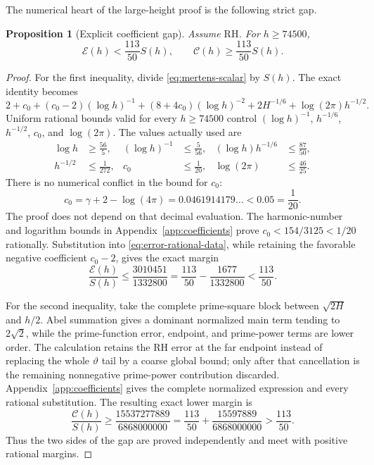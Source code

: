 \documentclass[11pt]{amsart}
\newtheorem{proposition}[theorem]{Proposition}
\theoremstyle{definition}
\theoremstyle{remark}
\numberwithin{equation}{section}
\newcommand{\RH}{\mathrm{RH}}
\newcommand{\euler}{\gamma}
\newcommand{\E}{\mathcal{E}}
\newcommand{\Pcost}{\mathcal{C}}
\begin{document}
The numerical heart of the large-height proof is the following strict gap.

\begin{proposition}[Explicit coefficient gap]\label{prop:coefficient-gap}
Assume $\RH$.  For $h\ge74500$,
\begin{equation}\label{eq:two-coefficients}
  \E(h)<\frac{113}{50}S(h),
  \qquad
  \Pcost(h)\ge\frac{113}{50}S(h).
\end{equation}
\end{proposition}

\begin{proof}
For the first inequality, divide \eqref{eq:mertens-scalar} by $S(h)$.
The exact identity becomes
\[
  2+c_0+(c_0-2)(\log h)^{-1}
  +(8+4c_0)(\log h)^{-2}
  +2H^{-1/6}+\log(2\pi)h^{-1/2}.
\]
Uniform rational bounds valid for every $h\ge74500$ control
$(\log h)^{-1}$, $h^{-1/6}$, $h^{-1/2}$, $c_0$, and $\log(2\pi)$.
The values actually used are
\begin{equation}\label{eq:error-rational-data}
\begin{aligned}
 \log h&\ge\frac{56}{5}, &
 (\log h)^{-1}&\le\frac5{56}, &
 (\log h)h^{-1/6}&\le\frac{87}{50},\\
 h^{-1/2}&\le\frac1{272}, &
 c_0&\le\frac1{20}, &
 \log(2\pi)&\le\frac{46}{25}.
\end{aligned}
\end{equation}
There is no numerical conflict in the bound for $c_0$:
\[
 c_0=\euler+2-\log(4\pi)
     =0.0461914179\ldots < 0.05=\frac1{20}.
\]
The proof does not depend on that decimal evaluation.  The harmonic-number
and logarithm bounds in Appendix~\ref{app:coefficients} prove
$c_0<154/3125<1/20$ rationally.  Substitution into
\eqref{eq:error-rational-data}, while retaining the favorable negative
coefficient $c_0-2$, gives the exact margin
\[
 \frac{\E(h)}{S(h)}\le\frac{3010451}{1332800}
 =\frac{113}{50}-\frac{1677}{1332800}<\frac{113}{50}.
\]

For the second inequality, take the complete prime-square block between
$\sqrt{2H}$ and $h/2$.  Abel summation gives a dominant normalized main term
tending to $2\sqrt2$, while the prime-function error, endpoint, and
prime-power terms are lower order.  The calculation retains the RH error at
the far endpoint instead of replacing the whole $\vartheta$ tail by a coarse
global bound; only after that cancellation is the remaining nonnegative
prime-power contribution discarded.  Appendix~\ref{app:coefficients} gives
the complete normalized expression and every rational substitution.  The
resulting exact lower margin is
\[
 \frac{\Pcost(h)}{S(h)}\ge
 \frac{15537277889}{6868000000}
 =\frac{113}{50}+\frac{15597889}{6868000000}>
 \frac{113}{50}.
\]
Thus the two sides of the gap are proved independently and meet with positive
rational margins.
\end{proof}
\end{document}
